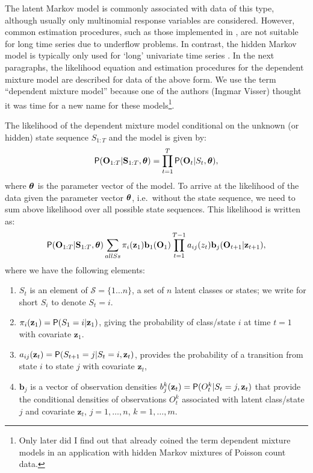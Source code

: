 \documentclass[article]{jss}
\newcommand{\vc}{\mathbf}
\newcommand{\greekv}[1]{\mbox{\boldmath$\mathrm{#1}$}}
\begin{document}
The latent Markov model is commonly associated with data of this type,
although usually only multinomial response variables are considered.
However, common estimation procedures, such as those implemented in
\citet{Pol1996}, are not suitable for long time series due to
underflow problems.  In contrast, the hidden Markov model is typically
only used for `long' univariate time series \citep[][,
chapter~1]{Cappe2005}.  In the next paragraphs, the likelihood
equation and estimation procedures for the dependent mixture model are
described for data of the above form.  We use the term ``dependent
mixture model'' because one of the authors (Ingmar Visser) thought it
was time for a new name for these models\footnote{Only later did I
find out that \citet{Leroux1992} already coined the term dependent
mixture models in an application with hidden Markov mixtures of
Poisson count data.}.


The likelihood of the dependent mixture model conditional on the
unknown (or hidden) state sequence $S_{1:T}$ and the model is given
by:
\begin{equation}
	\Prob( \vc{O}_{1:T} | \vc{S}_{1:T}, \greekv{\theta} ) = 
	\prod_{t=1}^{T}  \Prob( \vc{O}_{t} | S_{t},  \greekv{\theta}),
\end{equation}
where $\greekv{\theta}$ is the parameter vector of the model.  To arrive
at the likelihood of the data given the parameter vector
$\greekv{\theta}$, i.e.\ without the state sequence, we need to sum
above likelihood over all possible state sequences. This likelihood 
is written as: 
\begin{equation}
	\Prob(\vc{O}_{1:T}|\vc{S}_{1:T},\greekv{\theta}) 
	\sum_{all Ss} \pi_{i}(\vc{z}_1) \vc{b}_{1}(\vc{O}_{1}) 
	\prod_{t=1}^{T-1} a_{ij}(z_{t}) \vc{b}_{j}(\vc{O}_{t+1}|\vc{z}_{t+1}),
\end{equation}
where we have the following elements:
\begin{enumerate}
	
	\item $S_{t}$ is an element of $\mathcal{S}=\{1\ldots n\}$, a set
	of $n$ latent classes or states; we write for short $S_{i}$ to
	denote $S_{t}=i$.
	
	\item $\pi_{i}(\vc{z}_1) = \Prob(S_1 = i|\vc{z}_1)$,
	giving the probability of class/state $i$ at time $t=1$ with
	covariate $\vc{z}_1$.
	
	\item $a_{ij}(\vc{z}_t) = \Prob(S_{t+1}=j|S_{t}=i,\vc{z}_t)$,
	provides the probability of a transition from state $i$ to state
	$j$ with covariate $\vc{z}_t$,
	
	\item $\vc{b}_{j}$ is a vector of observation densities
	$b_j^k(\vc{z}_t) = \Prob(O_{t}^k|S_t = j, \vc{z}_t)$ that provide the
	conditional densities of observations $O_{t}^k$ associated with
	latent class/state $j$ and covariate $\vc{z}_t$, $j=1, \ldots, n$,
	$k=1, \ldots, m$. 
\end{enumerate}
\end{document}

